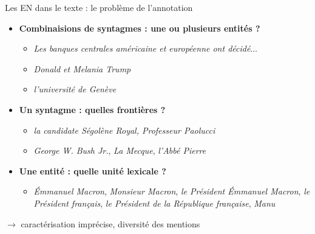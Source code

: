 \documentclass[xetex,xcolor={table,usenames,dvipsnames}]{beamer}
\begin{document}
\begin{frame}{Les \textsc{EN} dans le texte : le problème de l'annotation}
	\begin{itemize}
		\item \textcolor{deepblue}{\textbf{Combinaisions de syntagmes : une ou plusieurs entités ?}}
		\begin{itemize}
			\item \textit{Les banques centrales américaine et européenne ont décidé$\dots$}
			\item 	\textit{Donald et Melania Trump}
			\item \textit{l'université de Genève}
		\end{itemize}
		\item \textcolor{deepblue}{\textbf{Un syntagme : quelles frontières ?}} 
		\begin{itemize}
			\item \textit{la candidate Ségolène Royal, Professeur Paolucci}
			\item \textit{George W. Bush Jr.}, \textit{La Mecque}, \textit{l'Abbé Pierre}
		\end{itemize}
		\item \textcolor{deepblue}{\textbf{Une entité : quelle unité lexicale ?}} 
		\begin{itemize}
			\item 		\textit{Émmanuel Macron}, \textit{Monsieur Macron}, \textit{le Président Émmanuel Macron}, \textit{le Président français}, \textit{le Président de la République française}, \textit{Manu}
		\end{itemize}

	\end{itemize}
	
	$\rightarrow$ \textcolor{deepred}{caractérisation imprécise, diversité des mentions}
\end{frame}
\end{document}
